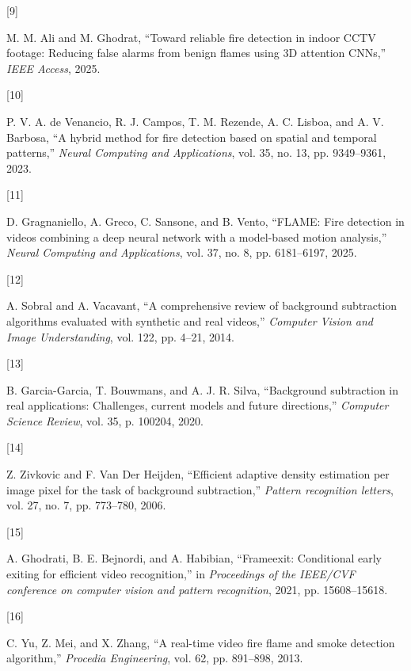 \documentclass[
  10pt,
]{article}
\newlength{\cslhangindent}
\newlength{\csllabelwidth}
\newenvironment{CSLReferences}[2] %
 {\begin{list}{}{%
  \setlength{\itemindent}{0pt}
  \setlength{\leftmargin}{0pt}
  \setlength{\parsep}{0pt}
  \ifodd #1
   \setlength{\leftmargin}{\cslhangindent}
   \setlength{\itemindent}{-1\cslhangindent}
  \fi
  \setlength{\itemsep}{#2\baselineskip}}}
 {\end{list}}
\newcommand{\CSLLeftMargin}[1]{\parbox[t]{\csllabelwidth}{\strut#1\strut}}
\newcommand{\CSLRightInline}[1]{\parbox[t]{\linewidth - \csllabelwidth}{\strut#1\strut}}
\begin{document}
\begin{CSLReferences}{0}{0}
\CSLLeftMargin{{[}9{]} }%
\CSLRightInline{M. M. Ali and M. Ghodrat, {``Toward reliable fire
detection in indoor CCTV footage: Reducing false alarms from benign
flames using 3D attention CNNs,''} \emph{IEEE Access}, 2025.}

\CSLLeftMargin{{[}10{]} }%
\CSLRightInline{P. V. A. de Venancio, R. J. Campos, T. M. Rezende, A. C.
Lisboa, and A. V. Barbosa, {``A hybrid method for fire detection based
on spatial and temporal patterns,''} \emph{Neural Computing and
Applications}, vol. 35, no. 13, pp. 9349--9361, 2023.}

\CSLLeftMargin{{[}11{]} }%
\CSLRightInline{D. Gragnaniello, A. Greco, C. Sansone, and B. Vento,
{``FLAME: Fire detection in videos combining a deep neural network with
a model-based motion analysis,''} \emph{Neural Computing and
Applications}, vol. 37, no. 8, pp. 6181--6197, 2025.}

\CSLLeftMargin{{[}12{]} }%
\CSLRightInline{A. Sobral and A. Vacavant, {``A comprehensive review of
background subtraction algorithms evaluated with synthetic and real
videos,''} \emph{Computer Vision and Image Understanding}, vol. 122, pp.
4--21, 2014.}

\CSLLeftMargin{{[}13{]} }%
\CSLRightInline{B. Garcia-Garcia, T. Bouwmans, and A. J. R. Silva,
{``Background subtraction in real applications: Challenges, current
models and future directions,''} \emph{Computer Science Review}, vol.
35, p. 100204, 2020.}

\CSLLeftMargin{{[}14{]} }%
\CSLRightInline{Z. Zivkovic and F. Van Der Heijden, {``Efficient
adaptive density estimation per image pixel for the task of background
subtraction,''} \emph{Pattern recognition letters}, vol. 27, no. 7, pp.
773--780, 2006.}

\CSLLeftMargin{{[}15{]} }%
\CSLRightInline{A. Ghodrati, B. E. Bejnordi, and A. Habibian,
{``Frameexit: Conditional early exiting for efficient video
recognition,''} in \emph{Proceedings of the IEEE/CVF conference on
computer vision and pattern recognition}, 2021, pp. 15608--15618.}

\CSLLeftMargin{{[}16{]} }%
\CSLRightInline{C. Yu, Z. Mei, and X. Zhang, {``A real-time video fire
flame and smoke detection algorithm,''} \emph{Procedia Engineering},
vol. 62, pp. 891--898, 2013.}


\end{CSLReferences}
\end{document}
